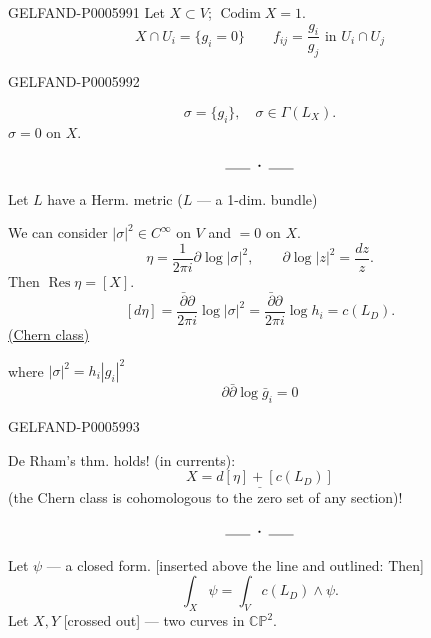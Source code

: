 \begin{GelfandAdjacentEvidence}{GELFAND-P000599}{1}
Let \(X\subset V\); \(\operatorname{Codim}X=1\).
\[
X\cap U_i=\{g_i=0\}\qquad f_{ij}=\frac{g_i}{g_j}\text{ in }U_i\cap U_j
\]
\end{GelfandAdjacentEvidence}
\begin{GelfandAdjacentEvidence}{GELFAND-P000599}{2}

\[
\sigma=\{g_i\},\quad\sigma\in\Gamma(L_X).
\]
\(\sigma=0\) on \(X\).

\[\rule{1.8em}{.4pt}\;\boldsymbol{\cdot}\;\rule{1.8em}{.4pt}\]

Let \(L\) have a Herm. metric (\(L\) — a 1-dim. bundle)

We can consider \(|\sigma|^2\in C^\infty\) on \(V\) and \(=0\) on \(X\).
\[
\eta=\frac{1}{2\pi i}\partial\log|\sigma|^2,\qquad
\partial\log|z|^2=\frac{dz}{z}.
\]
Then \(\operatorname{Res}\eta=[X]\).
\[
[d\eta]=\frac{\bar\partial\partial}{2\pi i}\log|\sigma|^2
=\frac{\bar\partial\partial}{2\pi i}\log h_i=c(L_D).
\]
\hfill\underline{(Chern class)}

where \(|\sigma|^2=h_i|g_i|^2\)
\[
\partial\bar\partial\log\bar g_i=0
\]
\end{GelfandAdjacentEvidence}
\begin{GelfandAdjacentEvidence}{GELFAND-P000599}{3}


De Rham’s thm. holds! (in currents):
\[
\underline{X=d[\eta]+[c(L_D)]}
\]
(the Chern class is cohomologous to the zero set of any section)!

\[\rule{1.8em}{.4pt}\;\boldsymbol{\cdot}\;\rule{1.8em}{.4pt}\]

Let \(\psi\) — a closed form. [inserted above the line and outlined: Then]
\[
\int_X\psi=\int_V c(L_D)\wedge\psi.
\]
 Let \(X,Y\) [crossed out] — two curves in \(\mathbb C\mathbb P^2\).
\end{GelfandAdjacentEvidence}
